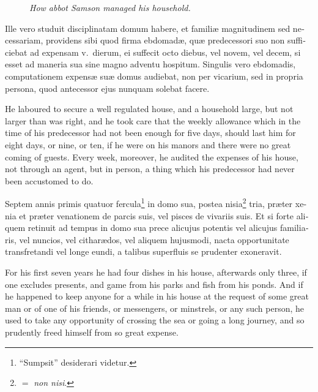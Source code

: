 \documentclass[10pt]{book}
\newcommand{\blockhead}[4][]{
\begin{figure}
\centering
\vspace{#4}
\parbox{2.75cm}{\begin{center}\footnotesize \color{BrickRed} \emph{#2}\\ #1 \end{center}}
\end{figure}
}
\begin{document}
\begin{paracol}{2}
\switchcolumn*

\begin{otherlanguage}{latin}
\blockhead{How abbot Samson managed his household.}{3}{-0.55cm}
Ille vero studuit disciplinatam domum habere, et famili\ae{} magnitudinem sed necessariam, providens sibi quod firma ebdomad\ae{}, qu\ae{} predecessori suo non sufficiebat ad expensam v.\ dierum, ei suffecit octo diebus, vel novem, vel decem, si esset ad maneria sua sine magno adventu hospitum. Singulis vero ebdomadis, computationem expens\ae{} su\ae{} domus audiebat, non per vicarium, sed in propria persona, quod antecessor ejus nunquam solebat facere.

\end{otherlanguage}

\switchcolumn

He laboured to secure a well regulated house, and a household large, but not larger than was right, and he took care that the weekly allowance which in the time of his predecessor had not been enough for five days, should last him for eight days, or nine, or ten, if he were on his manors and there were no great coming of guests. Every week, moreover, he audited the expenses of his house, not through an agent, but in person, a thing which his predecessor had never been accustomed to do.

\switchcolumn*

\begin{otherlanguage}{latin}
Septem annis primis quatuor fercula\footnote[\textdagger]{``Sumpsit'' desiderari videtur.} in domo sua, postea nisia\footnote[\ddag]{$=$ \emph{non nisi}.} tria, pr\ae{}ter xenia et pr\ae{}ter venationem de parcis suis, vel pisces de vivariis suis. Et si forte aliquem retinuit ad tempus in domo sua prece alicujus potentis vel alicujus familiaris, vel nuncios, vel cithar\ae{}dos, vel aliquem hujusmodi, nacta opportunitate transfretandi vel longe eundi, a talibus superfluis se prudenter exoneravit.
\end{otherlanguage}

\switchcolumn

For his first seven years he had four dishes in his house, afterwards only three, if one excludes presents, and game from his parks and fish from his ponds. And if he happened to keep anyone for a while in his house at the request of some great man or of one of his friends, or messengers, or minstrels, or any such person, he used to take any opportunity of crossing the sea or going a long journey, and so prudently freed himself from so great expense.


\end{paracol}
\end{document}
